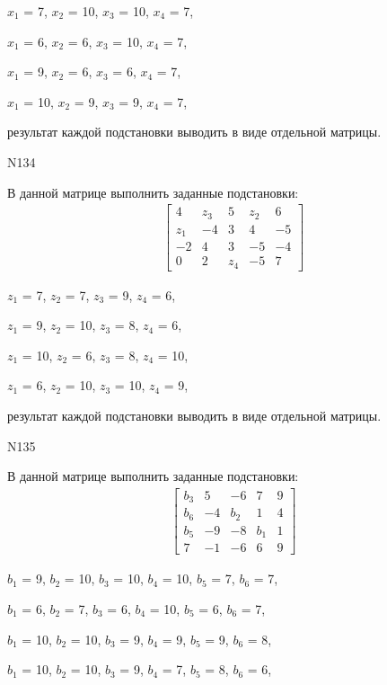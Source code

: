 \documentclass[11pt]{report}
\begin{document}
$x_{1}$ = 7, $x_{2}$ = 10, $x_{3}$ = 10, $x_{4}$ = 7, 

$x_{1}$ = 6, $x_{2}$ = 6, $x_{3}$ = 10, $x_{4}$ = 7, 

$x_{1}$ = 9, $x_{2}$ = 6, $x_{3}$ = 6, $x_{4}$ = 7, 

$x_{1}$ = 10, $x_{2}$ = 9, $x_{3}$ = 9, $x_{4}$ = 7, 

результат каждой подстановки выводить в виде отдельной матрицы.

N134

В данной матрице выполнить заданные подстановки:
\begin{align*}
\left[\begin{matrix}4 & z_{3} & 5 & z_{2} & 6\\z_{1} & -4 & 3 & 4 & -5\\-2 & 4 & 3 & -5 & -4\\0 & 2 & z_{4} & -5 & 7\end{matrix}\right]
\end{align*}


$z_{1}$ = 7, $z_{2}$ = 7, $z_{3}$ = 9, $z_{4}$ = 6, 

$z_{1}$ = 9, $z_{2}$ = 10, $z_{3}$ = 8, $z_{4}$ = 6, 

$z_{1}$ = 10, $z_{2}$ = 6, $z_{3}$ = 8, $z_{4}$ = 10, 

$z_{1}$ = 6, $z_{2}$ = 10, $z_{3}$ = 10, $z_{4}$ = 9, 

результат каждой подстановки выводить в виде отдельной матрицы.

N135

В данной матрице выполнить заданные подстановки:
\begin{align*}
\left[\begin{matrix}b_{3} & 5 & -6 & 7 & 9\\b_{6} & -4 & b_{2} & 1 & 4\\b_{5} & -9 & -8 & b_{1} & 1\\7 & -1 & -6 & 6 & 9\end{matrix}\right]
\end{align*}


$b_{1}$ = 9, $b_{2}$ = 10, $b_{3}$ = 10, $b_{4}$ = 10, $b_{5}$ = 7, $b_{6}$ = 7, 

$b_{1}$ = 6, $b_{2}$ = 7, $b_{3}$ = 6, $b_{4}$ = 10, $b_{5}$ = 6, $b_{6}$ = 7, 

$b_{1}$ = 10, $b_{2}$ = 10, $b_{3}$ = 9, $b_{4}$ = 9, $b_{5}$ = 9, $b_{6}$ = 8, 

$b_{1}$ = 10, $b_{2}$ = 10, $b_{3}$ = 9, $b_{4}$ = 7, $b_{5}$ = 8, $b_{6}$ = 6, 
\end{document}
